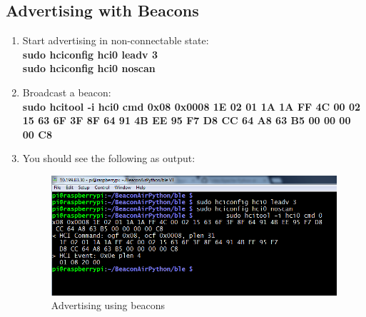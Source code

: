 \subsection{Advertising with Beacons}
	\begin{enumerate}
		\item Start advertising in non-connectable state:\\
			\textbf{sudo hciconfig hci0 leadv 3}\\
			\textbf{sudo hciconfig hci0 noscan}
		\item Broadcast a beacon:\\
			\textbf{sudo hcitool -i hci0 cmd 0x08 0x0008 1E 02 01 1A 1A FF 4C 00 02 15 63 6F 3F 8F 64 91 4B EE 95 F7 D8 CC 64 A8 63 B5 00 00 00 00 C8}
		\item You should see the following as output:
			\begin{figure}[ht]
				\centering
				\includegraphics[scale=0.5]{images/advertising_beacons.png}
				\caption{Advertising using beacons}
			\end{figure}
	\end{enumerate}
